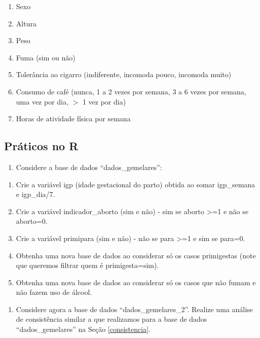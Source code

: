 \documentclass[
]{book}
\providecommand{\tightlist}{%
  \setlength{\itemsep}{0pt}\setlength{\parskip}{0pt}}
\begin{document}
\begin{enumerate}
\def\labelenumi{\alph{enumi}.}
\item
  Sexo
\item
  Altura
\item
  Peso
\item
  Fuma (sim ou não)
\item
  Tolerância ao cigarro (indiferente, incomoda pouco, incomoda muito)
\item
  Consumo de café (nunca, 1 a 2 vezes por semana, 3 a 6 vezes por semana, uma vez por dia, \(>\) 1 vez por dia)
\item
  Horas de atividade física por semana
\end{enumerate}

\hypertarget{pruxe1ticos-no-r}{%
\subsection{Práticos no R}\label{pruxe1ticos-no-r}}

\begin{enumerate}
\def\labelenumi{\arabic{enumi}.}
\setcounter{enumi}{4}
\tightlist
\item
  Considere a base de dados ``dados\_gemelares'':
\end{enumerate}

\begin{enumerate}
\def\labelenumi{\alph{enumi}.}
\item
  Crie a variável igp (idade gestacional do parto)
  obtida ao somar igp\_semana e igp\_dia/7.
\item
  Crie a variável indicador\_aborto (sim e não) - sim se aborto \textgreater=1 e não se aborto=0.
\item
  Crie a variável primipara (sim e não) - não se para \textgreater=1 e sim se para=0.
\item
  Obtenha uma nova base de dados ao considerar só os casos primigestas (note que queremos filtrar quem é primigesta=sim).
\item
  Obtenha uma nova base de dados ao considerar só os casos que não fumam e não fazem uso de álcool.
\end{enumerate}

\begin{enumerate}
\def\labelenumi{\arabic{enumi}.}
\setcounter{enumi}{5}
\tightlist
\item
  Considere agora a base de dados ``dados\_gemelares\_2''. Realize uma análise de consistência similar a que realizamos para a base de dados ``dados\_gemelares'' na Seção \ref{consistencia}.
\end{enumerate}
\end{document}
